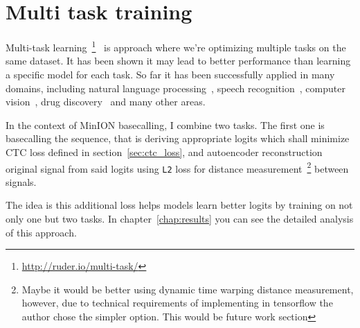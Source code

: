 \documentclass[times, utf8, diplomski, english]{fer}
\begin{document}
\section{Multi task training}
Multi-task learning~\footnote{\url{http://ruder.io/multi-task/}}~\citep{multi-task-learning,Caruana1997,DBLP:journals/corr/abs-1106-0245} is approach where we're optimizing multiple tasks on the same dataset. 
It has been shown it may lead to better performance than learning a specific model for each task. 
So far it has been successfully applied in many domains, including natural language processing~\citep{Collobert:2008:UAN:1390156.1390177}, speech recognition~\citep{speech_multitask}, computer vision~\citep{cv-multitask}, drug discovery~\citep{ramsundar2015massively} and many other areas. 

In the context of MinION basecalling, I combine two tasks. 
The first one is basecalling the sequence, that is deriving appropriate logits which shall minimize CTC loss defined in section~\ref{sec:ctc_loss}, and autoencoder reconstruction original signal from said logits using \texttt{L2} loss for distance measurement~\footnote{Maybe it would be better using dynamic time warping distance measurement, however, due to technical requirements of implementing in tensorflow the author chose the simpler option. This would be future work section} between signals. 

The idea is this additional loss helps models learn better logits by training on not only one but two tasks. In chapter~\ref{chap:results} you can see the detailed analysis of this approach.


\end{document}
